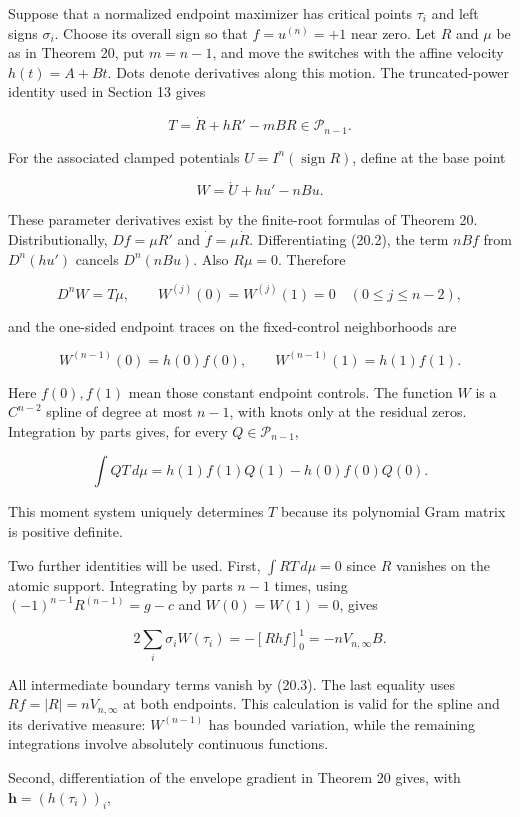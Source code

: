 \documentclass[11pt]{article}
\begin{document}
Suppose that a normalized endpoint maximizer has critical points
\(\tau_i\) and left signs \(\sigma_i\). Choose its overall sign so that
\(f=u^{(n)}=+1\) near zero. Let \(R\) and \(\mu\) be as in Theorem 20,
put \(m=n-1\), and move the switches with the affine velocity
\(h(t)=A+Bt\). Dots denote derivatives along this motion. The
truncated-power identity used in Section 13 gives

\[
T=\dot R+hR'-mBR\in\mathcal P_{n-1}.
\tag{20.1}
\]

For the associated clamped potentials \(U=I^n(\operatorname{sign}R)\),
define at the base point

\[
W=\dot U+hu'-nBu.
\tag{20.2}
\]

These parameter derivatives exist by the finite-root formulas of Theorem
20. Distributionally, \(Df=\mu R'\) and \(\dot f=\mu\dot R\).
Differentiating (20.2), the term \(nBf\) from \(D^n(hu')\) cancels
\(D^n(nBu)\). Also \(R\mu=0\). Therefore

\[
D^nW=T\mu,
\qquad
W^{(j)}(0)=W^{(j)}(1)=0\quad(0\le j\le n-2),
\tag{20.3}
\]

and the one-sided endpoint traces on the fixed-control neighborhoods are

\[
W^{(n-1)}(0)=h(0)f(0),
\qquad W^{(n-1)}(1)=h(1)f(1).
\tag{20.4}
\]

Here \(f(0),f(1)\) mean those constant endpoint controls. The function
\(W\) is a \(C^{n-2}\) spline of degree at most \(n-1\), with knots only
at the residual zeros. Integration by parts gives, for every
\(Q\in\mathcal P_{n-1}\),

\[
\int QT\,d\mu=h(1)f(1)Q(1)-h(0)f(0)Q(0).
\tag{20.5}
\]

This moment system uniquely determines \(T\) because its polynomial Gram
matrix is positive definite.

Two further identities will be used. First, \(\int R T\,d\mu=0\) since
\(R\) vanishes on the atomic support. Integrating by parts \(n-1\)
times, using \((-1)^{n-1}R^{(n-1)}=g-c\) and \(W(0)=W(1)=0\), gives

\[
2\sum_i\sigma_iW(\tau_i)
=-[Rhf]_0^1=-nV_{n,\infty}B.
\tag{20.6}
\]

All intermediate boundary terms vanish by (20.3). The last equality uses
\(Rf=|R|=nV_{n,\infty}\) at both endpoints. This calculation is valid
for the spline and its derivative measure: \(W^{(n-1)}\) has bounded
variation, while the remaining integrations involve absolutely
continuous functions.

Second, differentiation of the envelope gradient in Theorem 20 gives,
with \(\mathbf h=(h(\tau_i))_i\),
\end{document}
